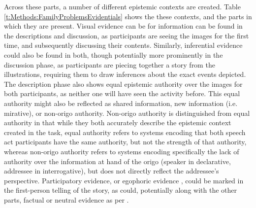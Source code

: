 Across these parts, a number of different epistemic contexts are created. Table \ref{t:Methods:FamilyProblemsEvidentials} shows the these contexts, and the parts in which they are present. Visual evidence can be for information can be found in the descriptions and discussion, as participants are seeing the images for the first time, and subsequently discussing their contents. Similarly, inferential evidence could also be found in both, though potentially more prominently in the discussion phase, as participants are piecing together a story from the illustrations, requiring them to draw inferences about the exact events depicted. The description phase also shows equal epistemic authority over the images for both participants, as neither one will have seen the activity before. This equal authority might also be reflected as shared information, new information (i.e. mirative), or non-origo authority. Non-origo authority is distinguished from equal authority in that while they both accurately describe the epistemic context created in the task, equal authority refers to systems encoding that both speech act participants have the same authority, but not the strength of that authority, whereas non-origo authority refers to systems encoding specifically the lack of authority over the information at hand of the origo (speaker in declarative, addressee in interrogative), but does not directly reflect the addressee's perspective. Participatory evidence, or egophoric evidence \cite[][see ]{Gawne2017}, could be marked in the first-person telling of the story, as could, potentially along with the other parts, factual or neutral evidence as per .

\begin{table}
       \noindent{}
       \caption{Epistemic contexts covered by each part of the Family Problems Picture Task}\label{t:Methods:FamilyProblemsEvidentials}
\end{table}



